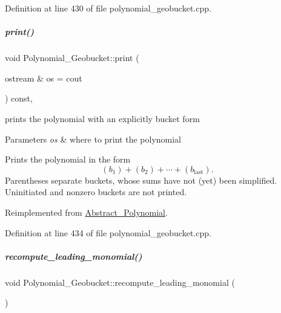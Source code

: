 Definition at line 430 of file polynomial\+\_\+geobucket.\+cpp.

\mbox{\label{group__polygroup_a3c8cb0c53e9acf4d60345fb4b4dbb807}} 
\subparagraph{\texorpdfstring{print()}{print()}\hspace{0.1cm}{\footnotesize\ttfamily [2/2]}}
{\footnotesize\ttfamily void Polynomial\+\_\+\+Geobucket\+::print (\begin{DoxyParamCaption}\item[{ostream \&}]{os = {\ttfamily cout} }\end{DoxyParamCaption}) const\hspace{0.3cm}{\ttfamily [override]}, {\ttfamily [virtual]}}



prints the polynomial with an explicitly bucket form 


\begin{DoxyParams}{Parameters}
{\em os} & where to print the polynomial\\
\hline
\end{DoxyParams}
Prints the polynomial in the form \[(b_1) + (b_2) + \cdots + (b_\textrm{last}).\] Parentheses separate buckets, whose sums have not (yet) been simplified. Uninitiated and nonzero buckets are not printed. 

Reimplemented from \hyperlink{group__polygroup_adbbb6af1fb79d5794af42e28d584641b}{Abstract\+\_\+\+Polynomial}.



Definition at line 434 of file polynomial\+\_\+geobucket.\+cpp.

\mbox{\label{group__polygroup_ab57dbe8d5f0d3860997775d9f354ab0c}} 
\subparagraph{\texorpdfstring{recompute\+\_\+leading\+\_\+monomial()}{recompute\_leading\_monomial()}}
{\footnotesize\ttfamily void Polynomial\+\_\+\+Geobucket\+::recompute\+\_\+leading\+\_\+monomial (\begin{DoxyParamCaption}{ }\end{DoxyParamCaption})}



